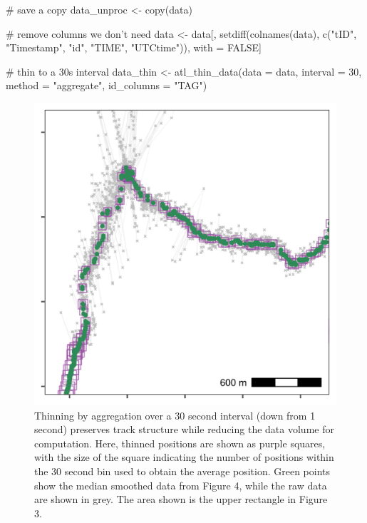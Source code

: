 \documentclass[]{scrreprt}
\newenvironment{Shaded}{}{}
\newcommand{\CommentTok}[1]{\textcolor[rgb]{0.00,0.50,0.00}{#1}}
\newcommand{\DataTypeTok}[1]{#1}
\newcommand{\DecValTok}[1]{#1}
\newcommand{\KeywordTok}[1]{\textcolor[rgb]{0.00,0.00,1.00}{#1}}
\newcommand{\NormalTok}[1]{#1}
\newcommand{\OtherTok}[1]{\textcolor[rgb]{1.00,0.25,0.00}{#1}}
\newcommand{\StringTok}[1]{\textcolor[rgb]{0.00,0.50,0.50}{#1}}
\begin{document}
\begin{Shaded}
\begin{Highlighting}[]
\CommentTok{# save a copy}
\NormalTok{data_unproc <-}\StringTok{ }\KeywordTok{copy}\NormalTok{(data)}

\CommentTok{# remove columns we don't need}
\NormalTok{data <-}\StringTok{ }\NormalTok{data[, }\KeywordTok{setdiff}\NormalTok{(}\KeywordTok{colnames}\NormalTok{(data), }
                       \KeywordTok{c}\NormalTok{(}\StringTok{"tID"}\NormalTok{, }\StringTok{"Timestamp"}\NormalTok{, }\StringTok{"id"}\NormalTok{, }\StringTok{"TIME"}\NormalTok{, }\StringTok{"UTCtime"}\NormalTok{)), }
\NormalTok{             with =}\StringTok{ }\OtherTok{FALSE}\NormalTok{]}

\CommentTok{# thin to a 30s interval}
\NormalTok{data_thin <-}\StringTok{ }\KeywordTok{atl_thin_data}\NormalTok{(}\DataTypeTok{data =}\NormalTok{ data,}
                           \DataTypeTok{interval =} \DecValTok{30}\NormalTok{,}
                           \DataTypeTok{method =} \StringTok{"aggregate"}\NormalTok{,}
                           \DataTypeTok{id_columns =} \StringTok{"TAG"}\NormalTok{)}
\end{Highlighting}
\end{Shaded}

\begin{figure}
\centering
\includegraphics{figures/fig_calib_smooth_thin.png}
\caption{Thinning by aggregation over a 30 second interval (down from 1 second) preserves track structure while reducing the data volume for computation. Here, thinned positions are shown as purple squares, with the size of the square indicating the number of positions within the 30 second bin used to obtain the average position. Green points show the median smoothed data from Figure 4, while the raw data are shown in grey. The area shown is the upper rectangle in Figure 3.}
\end{figure}
\end{document}

